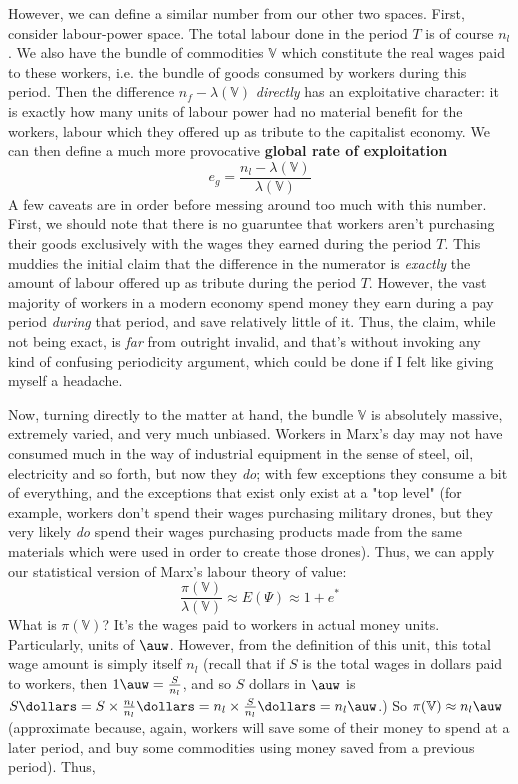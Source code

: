 \documentclass{article}
\theoremstyle{definition}
\theoremstyle{plain}
\theoremstyle{theorem}
\begin{document}
However, we can define a similar number from our other two spaces. First, consider labour-power space. The total labour done in the period $T$ is of course $n_l$. We also have the bundle of commodities $\mathbb{V}$ which constitute the real wages paid to these workers, i.e. the bundle of goods consumed by workers during this period. Then the difference $n_f - \lambda(\mathbb{V})$ \textit{directly} has an exploitative character: it is exactly how many units of labour power had no material benefit for the workers, labour which they offered up as tribute to the capitalist economy. We can then define a much more provocative \textbf{global rate of exploitation}
\[ e_g = \frac{n_l - \lambda(\mathbb{V})}{\lambda(\mathbb{V})} \]
A few caveats are in order before messing around too much with this number. First, we should note that there is no guaruntee that workers aren't purchasing their goods exclusively with the wages they earned during the period $T$. This muddies the initial claim that the difference in the numerator is \textit{exactly} the amount of labour offered up as tribute during the period $T$. However, the vast majority of workers in a modern economy spend money they earn during a pay period \textit{during} that period, and save relatively little of it. Thus, the claim, while not being exact, is \textit{far} from outright invalid, and that's without invoking any kind of confusing periodicity argument, which could be done if I felt like giving myself a headache. \par 
Now, turning directly to the matter at hand, the bundle $\mathbb{V}$ is absolutely massive, extremely varied, and very much unbiased. Workers in Marx's day may not have consumed much in the way of industrial equipment in the sense of steel, oil, electricity and so forth, but now they \textit{do}; with few exceptions they consume a bit of everything, and the exceptions that exist only exist at a "top level" (for example, workers don't spend their wages purchasing military drones, but they very likely \textit{do} spend their wages purchasing products made from the same materials which were used in order to create those drones). Thus, we can apply our statistical version of Marx's labour theory of value:
\[ \frac{\pi(\mathbb{V})}{\lambda(\mathbb{V})} \approx E(\Psi) \approx 1+e^* \]
What is $\pi(\mathbb{V})$? It's the wages paid to workers in actual money units. Particularly, units of $\auw$. However, from the definition of this unit, this total wage amount is simply itself $n_l$ (recall that if $S$ is the total wages in dollars paid to workers, then $1\auw = \frac{S}{n_l}$, and so $S$ dollars in $\auw$ is $S \dollars = S \times \frac{n_l}{n_l} \dollars = n_l \times \frac{S}{n_l} \dollars = n_l \auw$.) So $\pi(\mathbb{V}) \approx n_l \auw$ (approximate because, again, workers will save some of their money to spend at a later period, and buy some commodities using money saved from a previous period). Thus,
\end{document}
